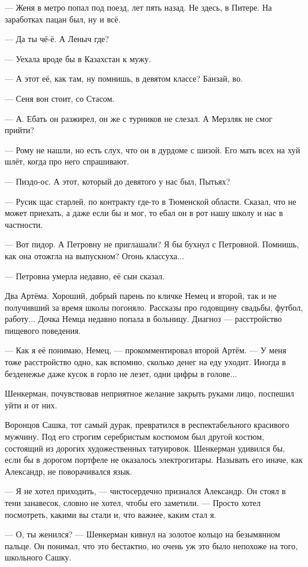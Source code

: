 --- Женя в метро попал под поезд, лет пять назад.
Не здесь, в Питере.
На заработках пацан был, ну и всё.

--- Да ты чё-ё.
А Леныч где?

--- Уехала вроде бы в Казахстан к мужу.

--- А этот её, как там, ну помнишь, в девятом классе?
Банзай, во.

--- Сеня вон стоит, со Стасом.

--- А.
Ебать он разжирел, он же с турников не слезал.
А Мерзляк не смог прийти?

--- Рому не нашли, но есть слух, что он в дурдоме с шизой.
Его мать всех на хуй шлёт, когда про него спрашивают.

--- Пиздо-ос.
А этот, который до девятого у нас был, Пытьях?

--- Русик щас старлей, по контракту где-то в Тюменской области.
Сказал, что не может приехать, а даже если бы и мог, то ебал он в рот нашу школу и нас в частности.

--- Вот пидор.
А Петровну не приглашали?
Я бы бухнул с Петровной.
Помнишь, как она отожгла на выпускном?
Огонь классуха...

--- Петровна умерла недавно, её сын сказал.

Два Артёма.
Хороший, добрый парень по кличке Немец и второй, так и не получивший за время школы погоняло.
Рассказы про годовщину свадьбы, футбол, работу...
Дочка Немца недавно попала в больницу.
Диагноз --- расстройство пищевого поведения.

--- Как я её понимаю, Немец, --- прокомментировал второй Артём.
--- У меня тоже расстройство одно, как вспомню, сколько денег на еду уходит.
Иногда в безденежье даже кусок в горло не лезет, одни цифры в голове...

Шенкерман, почувствовав неприятное желание закрыть руками лицо, поспешил уйти и от них.

Воронцов Сашка, тот самый дурак, превратился в респектабельного красивого мужчину.
Под его строгим серебристым костюмом был другой костюм, состоящий из дорогих художественных татуировок.
Шенкерман удивился бы, если бы в дорогом портфеле не оказалось электрогитары.
Называть его иначе, как Александр, не поворачивался язык.

--- Я не хотел приходить, --- чистосердечно признался Александр.
Он стоял в тени занавесок, словно не хотел, чтобы его заметили.
--- Просто хотел посмотреть, какими вы стали и, что важнее, каким стал я.

--- О, ты женился? --- Шенкерман кивнул на золотое кольцо на безымянном пальце.
Он понимал, что это бестактно, но очень уж это было непохоже на того, школьного Сашку.

